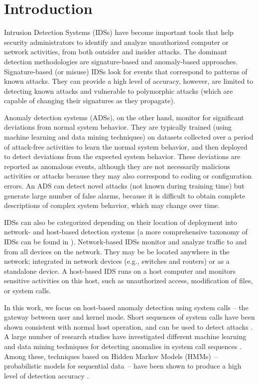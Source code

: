 \chapter{Introduction} \label{chapter1}


Intrusion Detection Systems (IDSs) have become important tools that help security administrators to identify and analyze unauthorized computer or network activities, from both outsider and insider attacks.
The dominant detection methodologies are signature-based and anomaly-based approaches.
Signature-based (or misuse) IDSs look for events that correspond to patterns of known attacks.
They can provide a high level of accuracy, however, are limited to detecting known attacks and vulnerable to polymorphic attacks (which are capable of changing their signatures as they propagate).

Anomaly detection systems (ADSs), on the other hand, monitor for significant deviations from normal system behavior.
They are typically trained (using machine learning and data mining techniques) on datasets collected over a period of attack-free activities to learn the normal system behavior, and then deployed to detect deviations from the expected system behavior.
These deviations are reported as anomalous events, although they are not necessarily malicious activities or attacks because they may also correspond to coding or configuration errors.
An ADS can detect novel attacks (not known during training time) but generate large number of false alarms, because it is difficult to obtain complete descriptions of complex system behavior, which may change over time.

IDSs can also be categorized depending on their location of deployment into network- and host-based detection systems (a more comprehensive taxonomy of IDSs can be found in \cite{Liao2013}).
Network-based IDSs monitor and analyze traffic to and from all devices on the network.
They may be be located anywhere in the network; integrated in network devices (e.g., switches and routers) or as a standalone device.
A host-based IDS runs on a host computer and monitors sensitive activities on this host, such as unauthorized access, modification of files, or system calls.

In this work, we focus on host-based anomaly detection using system calls -- the gateway between user and kernel mode.
Short sequences of system calls have been shown consistent with normal host operation, and can be used to detect attacks \cite{Forrest1996,Warrender1999}.
A large number of research studies have investigated different machine learning and data mining techniques for detecting anomalies in system call sequences \cite{Forrest2008}.
Among these, techniques based on Hidden Markov Models (HMMs)~-- probabilistic models for sequential data~-- have been shown to produce a high level of detection accuracy \cite{Du2004,Gao2002,Hoang2004,Hu2010,Wang2004,Warrender1999,Zhang2003,Khreich2009-ICC, Sultana2012, Murtaza2012}.

